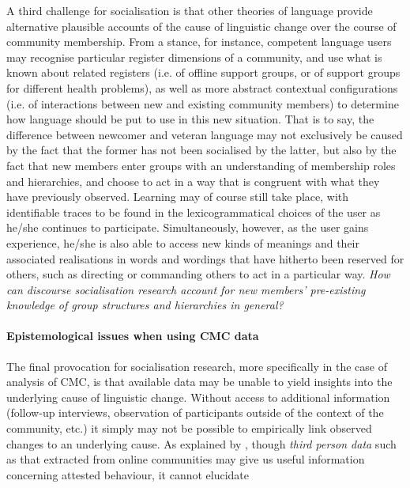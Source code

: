 A third challenge for socialisation is that other theories of language provide alternative plausible accounts of the cause of linguistic change over the course of community membership. From a  stance, for instance, competent language users may recognise particular register dimensions of a community, and use what is known about related registers (i.e. of offline support groups, or of support groups for different health problems), as well as more abstract contextual configurations (i.e. of interactions between new and existing community members) to determine how language should be put to use in this new situation. That is to say, the difference between newcomer and veteran language may not exclusively be caused by the fact that the former has not been socialised by the latter, but also by the fact that new members enter groups with an understanding of membership roles and hierarchies, and choose to act in a way that is congruent with what they have previously observed. Learning may of course still take place, with identifiable traces to be found in the lexicogrammatical choices of the user as he\slash she continues to participate. Simultaneously, however, as the user gains experience, he\slash she is also able to access new kinds of meanings and their associated realisations in words and wordings that have hitherto been reserved for others, such as directing or commanding others to act in a particular way. \emph{How can discourse socialisation research account for new members' pre\hyp{}existing knowledge of group structures and hierarchies in general?}

\paragraph{Epistemological issues when using CMC data}

The final provocation for socialisation research, more specifically in the case of analysis of \gls{CMC}, is that available data may be unable to yield insights into the underlying cause of linguistic change. Without access to additional information (follow\hyp{}up interviews, observation of participants outside of the context of the community, etc.) it simply may not be possible to empirically link observed changes to an underlying cause. As explained by \textcite{widdowson_limitations_2000}, though \emph{third person data} such as that extracted from online communities may give us useful information concerning attested behaviour, it cannot elucidate

